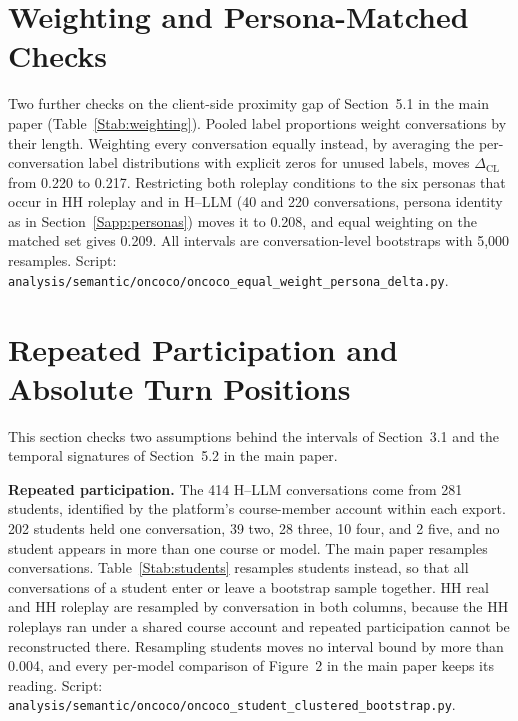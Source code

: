\documentclass[fleqn,10pt]{JLA_article}
\newcommand{\fitwidth}[1]{\resizebox{\ifdim\width>\linewidth \linewidth\else \width\fi}{!}{#1}}
\begin{document}
\section{Weighting and Persona-Matched Checks}
\label{Ssec:weighting}
Two further checks on the client-side proximity gap of Section~5.1 in the main paper (Table~\ref{Stab:weighting}). Pooled label proportions weight conversations by their length. Weighting every conversation equally instead, by averaging the per-conversation label distributions with explicit zeros for unused labels, moves $\Delta_{\mathrm{CL}}$ from 0.220 to 0.217. Restricting both roleplay conditions to the six personas that occur in HH roleplay and in H--LLM (40 and 220 conversations, persona identity as in Section~\ref{Sapp:personas}) moves it to 0.208, and equal weighting on the matched set gives 0.209. All intervals are conversation-level bootstraps with 5{,}000 resamples. Script: \texttt{analysis/semantic/oncoco/oncoco\_equal\_weight\_persona\_delta.py}.

\begin{table}[t]
\caption{Client-side proximity gap under equal conversation weighting and persona matching. JSD to HH real for H--LLM and HH roleplay, and their difference $\Delta_{\mathrm{CL}}$ with a 95\% conversation-level bootstrap interval. The first row reproduces the pooled result of the main paper.}
\label{Stab:weighting}
\centering
\footnotesize
\setlength{\tabcolsep}{4pt}
\fitwidth{}
\end{table}

\section{Repeated Participation and Absolute Turn Positions}
\label{Ssec:participation}
This section checks two assumptions behind the intervals of Section~3.1 and the temporal signatures of Section~5.2 in the main paper.

\textbf{Repeated participation.} The 414 H--LLM conversations come from 281 students, identified by the platform's course-member account within each export. 202 students held one conversation, 39 two, 28 three, 10 four, and 2 five, and no student appears in more than one course or model. The main paper resamples conversations. Table~\ref{Stab:students} resamples students instead, so that all conversations of a student enter or leave a bootstrap sample together. HH real and HH roleplay are resampled by conversation in both columns, because the HH roleplays ran under a shared course account and repeated participation cannot be reconstructed there. Resampling students moves no interval bound by more than 0.004, and every per-model comparison of Figure~2 in the main paper keeps its reading. Script: \texttt{analysis/semantic/oncoco/oncoco\_student\_clustered\_bootstrap.py}.
\end{document}
